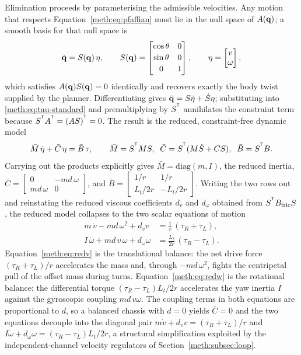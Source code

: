 Elimination proceeds by parameterising the admissible velocities. Any motion that respects Equation~\eqref{meth:eq:pfaffian} must lie in the null space of $A(\mathbf{q})$; a smooth basis for that null space is
\begin{equation}\label{meth:eq:nullspace}
\dot{\mathbf{q}}=S(\mathbf{q})\,\eta,
\qquad
S(\mathbf{q})=
\begin{bmatrix}
\cos\theta & 0\\[2pt]
\sin\theta & 0\\[2pt]
0 & 1
\end{bmatrix},
\qquad
\eta=\begin{bmatrix}v\\\omega\end{bmatrix},
\end{equation}
which satisfies $A(\mathbf{q})S(\mathbf{q})=0$ identically and recovers exactly the body twist supplied by the planner. Differentiating gives $\ddot{\mathbf{q}}=S\dot\eta+\dot S\eta$; substituting into \eqref{meth:eq:tau-standard} and premultiplying by $S^{^{\mathsf{T}}}$ annihilates the constraint term because $S^{^{\mathsf{T}}}A^{^{\mathsf{T}}}=(AS)^{^{\mathsf{T}}}=0$. The result is the reduced, constraint-free dynamic model
\begin{equation}\label{meth:eq:reduced}
\bar M\,\dot\eta + \bar C\,\eta = \bar B\,\tau,
\qquad
\bar M=S^{^{\mathsf{T}}}M S,\;\;
\bar C=S^{^{\mathsf{T}}}(M\dot S+CS),\;\;
\bar B=S^{^{\mathsf{T}}}B.
\end{equation}
Carrying out the products explicitly gives $\bar M=\mathrm{diag}(m,I)$, the reduced inertia, $\bar C=\left[\begin{smallmatrix}0 & -md\,\omega\\ md\,\omega & 0\end{smallmatrix}\right]$, and $\bar B=\left[\begin{smallmatrix}1/r & 1/r\\ L_t/2r & -L_t/2r\end{smallmatrix}\right]$. Writing the two rows out and reinstating the reduced viscous coefficients $d_v$ and $d_\omega$ obtained from $S^{^{\mathsf{T}}}B_{\mathrm{fric}}S$, the reduced model collapses to the two scalar equations of motion
\begin{align}
m\,\dot v - m d\,\omega^{2} + d_v v
&= \tfrac{1}{r}\,(\tau_R+\tau_L),\label{meth:eq:redv}\\
I\,\dot\omega + m d\,v\,\omega + d_\omega \omega
&= \tfrac{L_t}{2r}\,(\tau_R-\tau_L).\label{meth:eq:redw}
\end{align}
Equation~\eqref{meth:eq:redv} is the translational balance: the net drive force $(\tau_R+\tau_L)/r$ accelerates the mass and, through $-md\,\omega^2$, fights the centripetal pull of the offset mass during turns. Equation~\eqref{meth:eq:redw} is the rotational balance: the differential torque $(\tau_R-\tau_L)L_t/2r$ accelerates the yaw inertia $I$ against the gyroscopic coupling $md\,v\omega$. The coupling terms in both equations are proportional to $d$, so a balanced chassis with $d=0$ yields $\bar C=0$ and the two equations decouple into the diagonal pair $m\dot v + d_v v=(\tau_R+\tau_L)/r$ and $I\dot\omega + d_\omega\omega=(\tau_R-\tau_L)L_t/2r$, a structural simplification exploited by the independent-channel velocity regulators of Section~\ref{meth:subsec:loop}.

